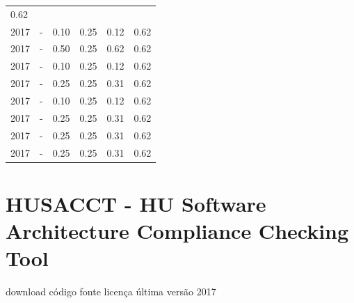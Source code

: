 \begin{table}[H]
\begin{tabular}{| l | c | c | c | c | c |}
            {\color{blue} 0.62}
          \\
            2017
          &
          -
          &
          0.10
          &
          0.25
          &
          0.12
          &
            {\color{blue} 0.62}
          \\
            2017
          &
          -
          &
          0.50
          &
          0.25
          &
          0.62
          &
            {\color{blue} 0.62}
          \\
            2017
          &
          -
          &
          0.10
          &
          0.25
          &
          0.12
          &
            {\color{blue} 0.62}
          \\
            2017
          &
          -
          &
          0.25
          &
          0.25
          &
          0.31
          &
            {\color{blue} 0.62}
          \\
            2017
          &
          -
          &
          0.10
          &
          0.25
          &
          0.12
          &
            {\color{blue} 0.62}
          \\
            2017
          &
          -
          &
          0.25
          &
          0.25
          &
          0.31
          &
            {\color{blue} 0.62}
          \\
            2017
          &
          -
          &
          0.25
          &
          0.25
          &
          0.31
          &
            {\color{blue} 0.62}
          \\
            2017
          &
          -
          &
          0.25
          &
          0.25
          &
          0.31
          &
            {\color{blue} 0.62}
          \\
\hline
\end{tabular}
\end{table}



\section{HUSACCT - HU Software Architecture Compliance Checking Tool}
\checkmark download
\checkmark código fonte
\checkmark licença
\checkmark última versão 2017


